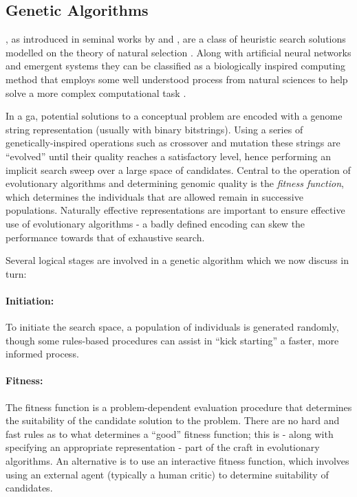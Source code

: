 \subsection{Genetic Algorithms}


, as introduced in seminal works by \cite{Holland1975} and \cite{Goldberg1989}, are a class of heuristic search solutions modelled on the theory of natural selection \citep{koza1992genetic, Srinivas1994}. Along with artificial neural networks and emergent systems they can be classified as a biologically inspired computing method that employs some well understood  process from natural sciences to help solve a more complex computational task \citep{Mitchell1998}.

In a \acrshort{ga}, potential solutions to a conceptual problem are encoded with a genome string representation (usually with binary bitstrings). Using a series of genetically-inspired operations such as crossover and mutation these strings are ``evolved'' until their quality reaches a satisfactory level, hence performing an implicit search sweep over a large space of candidates.  Central to the operation of evolutionary algorithms and determining genomic quality is the \textit{fitness function}, which determines the individuals that are allowed remain in successive populations. Naturally effective representations are important to ensure effective use of evolutionary algorithms - a badly defined encoding can skew the performance towards that of exhaustive search. 

Several logical stages are involved in a genetic algorithm which we now discuss in turn:

\paragraph{Initiation:}
To initiate the search space, a population of individuals is generated randomly, though some rules-based procedures can assist in “kick starting” a faster, more informed process.

\paragraph{Fitness:}
The fitness function is a problem-dependent evaluation procedure that determines the suitability of the candidate solution to the problem. There are no hard and fast rules as to what determines a “good” fitness function; this is - along with specifying an appropriate representation - part of the craft in evolutionary algorithms. An alternative is to use an interactive fitness function, which involves using an external agent (typically a human critic) to determine suitability of candidates. 

